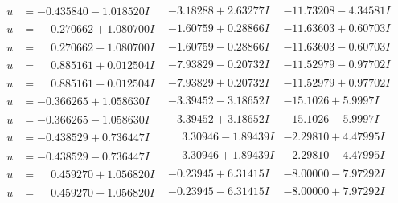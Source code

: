 \documentclass[1p]{elsarticle_modified}
\theoremstyle{definition}
\begin{document}
$$\begin{array}{c|c|c}
\begin{aligned}
u &= -0.435840 - 1.018520 I\end{aligned}
 & -3.18288 + 2.63277 I & -11.73208 - 4.34581 I \\ \hline\begin{aligned}
u &= \phantom{-}0.270662 + 1.080700 I\end{aligned}
 & -1.60759 + 0.28866 I & -11.63603 + 0.60703 I \\ \hline\begin{aligned}
u &= \phantom{-}0.270662 - 1.080700 I\end{aligned}
 & -1.60759 - 0.28866 I & -11.63603 - 0.60703 I \\ \hline\begin{aligned}
u &= \phantom{-}0.885161 + 0.012504 I\end{aligned}
 & -7.93829 - 0.20732 I & -11.52979 - 0.97702 I \\ \hline\begin{aligned}
u &= \phantom{-}0.885161 - 0.012504 I\end{aligned}
 & -7.93829 + 0.20732 I & -11.52979 + 0.97702 I \\ \hline\begin{aligned}
u &= -0.366265 + 1.058630 I\end{aligned}
 & -3.39452 - 3.18652 I & -15.1026 + 5.9997 I \\ \hline\begin{aligned}
u &= -0.366265 - 1.058630 I\end{aligned}
 & -3.39452 + 3.18652 I & -15.1026 - 5.9997 I \\ \hline\begin{aligned}
u &= -0.438529 + 0.736447 I\end{aligned}
 & \phantom{-}3.30946 - 1.89439 I & -2.29810 + 4.47995 I \\ \hline\begin{aligned}
u &= -0.438529 - 0.736447 I\end{aligned}
 & \phantom{-}3.30946 + 1.89439 I & -2.29810 - 4.47995 I \\ \hline\begin{aligned}
u &= \phantom{-}0.459270 + 1.056820 I\end{aligned}
 & -0.23945 + 6.31415 I & -8.00000 - 7.97292 I \\ \hline\begin{aligned}
u &= \phantom{-}0.459270 - 1.056820 I\end{aligned}
 & -0.23945 - 6.31415 I & -8.00000 + 7.97292 I \\ \hline\begin{aligned}

\end{aligned}
\end{array}$$
\end{document}

